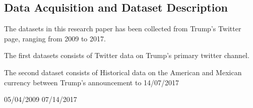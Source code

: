 \documentclass{article}
\begin{document}
\subsection{Data Acquisition and Dataset Description}
The datasets in this research paper has been collected from Trump's Twitter page, ranging from 2009 to 2017.

The first datasets consists of Twitter data on Trump's primary twitter channel. 

The second dataset consists of Historical data on the American and Mexican currency between Trump's announcement to  14/07/2017

05/04/2009
07/14/2017


\end{document}
